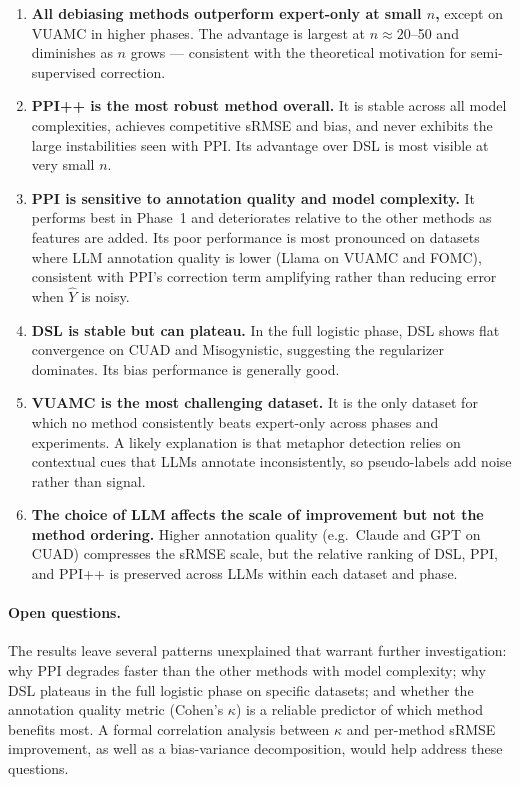 \begin{enumerate}
    \item \textbf{All debiasing methods outperform expert-only at small $n$,} except on VUAMC in higher phases. The advantage is largest at $n \approx 20$–50 and diminishes as $n$ grows — consistent with the theoretical motivation for semi-supervised correction.

    \item \textbf{PPI++ is the most robust method overall.} It is stable across all model complexities, achieves competitive sRMSE and bias, and never exhibits the large instabilities seen with PPI. Its advantage over DSL is most visible at very small $n$.

    \item \textbf{PPI is sensitive to annotation quality and model complexity.} It performs best in Phase~1 and deteriorates relative to the other methods as features are added. Its poor performance is most pronounced on datasets where LLM annotation quality is lower (Llama on VUAMC and FOMC), consistent with PPI's correction term amplifying rather than reducing error when $\hat{Y}$ is noisy.

    \item \textbf{DSL is stable but can plateau.} In the full logistic phase, DSL shows flat convergence on CUAD and Misogynistic, suggesting the regularizer dominates. Its bias performance is generally good.

    \item \textbf{VUAMC is the most challenging dataset.} It is the only dataset for which no method consistently beats expert-only across phases and experiments. A likely explanation is that metaphor detection relies on contextual cues that LLMs annotate inconsistently, so pseudo-labels add noise rather than signal.

    \item \textbf{The choice of LLM affects the scale of improvement but not the method ordering.} Higher annotation quality (e.g.\ Claude and GPT on CUAD) compresses the sRMSE scale, but the relative ranking of DSL, PPI, and PPI++ is preserved across LLMs within each dataset and phase.
\end{enumerate}

\paragraph{Open questions.} The results leave several patterns unexplained that warrant further investigation: why PPI degrades faster than the other methods with model complexity; why DSL plateaus in the full logistic phase on specific datasets; and whether the annotation quality metric (Cohen's $\kappa$) is a reliable predictor of which method benefits most. A formal correlation analysis between $\kappa$ and per-method sRMSE improvement, as well as a bias-variance decomposition, would help address these questions.
